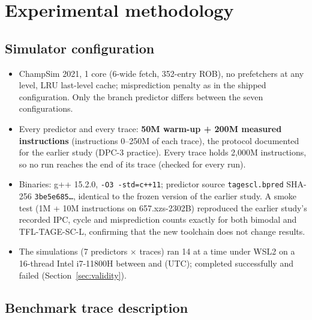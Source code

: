 \documentclass[11pt,a4paper]{article}
\newcommand{\code}[1]{\texttt{#1}}
\newcommand{\prop}{TFL-TAGE-SC-L}
\renewcommand{\_}{\textunderscore\allowbreak}
\begin{document}
\section{Experimental methodology}\label{sec:method}

\subsection{Simulator configuration}
\begin{itemize}
\item ChampSim 2021, 1 core (6-wide fetch, 352-entry ROB), no prefetchers at any level, LRU last-level cache; misprediction penalty as in the shipped configuration. Only the branch predictor differs between the seven configurations.
\item Every predictor and every trace: \textbf{50M warm-up + 200M measured instructions} (instructions 0--250M of each trace), the protocol documented for the earlier study (DPC-3 practice). Every trace holds 2,000M instructions, so no run reaches the end of its trace (checked for every run).
\item Binaries: g++ 15.2.0, \code{-O3 -std=c++11}; predictor source \code{tagescl.bpred} SHA-256 \code{3be5e685\ldots}, identical to the frozen version of the earlier study. A smoke test (1M + 10M instructions on 657.xz\_s-2302B) reproduced the earlier study's recorded IPC, cycle and misprediction counts exactly for both bimodal and \prop{}, confirming that the new toolchain does not change results.
\item The  simulations (7 predictors $\times$  traces) ran 14 at a time under WSL2 on a 16-thread Intel i7-11800H between  and  (UTC);  completed successfully and  failed (Section~\ref{sec:validity}).
\end{itemize}

\subsection{Benchmark trace description}\label{sec:traces}
\end{document}
